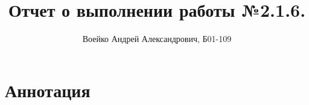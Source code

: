\documentclass[a4paper,11pt]{book}
\title{Отчет о выполнении работы №2.1.6.\\}
\author{Воейко Андрей Александрович, Б01-109}
\begin{document}
\maketitle
\newpage
\section{Аннотация}
\end{document}

